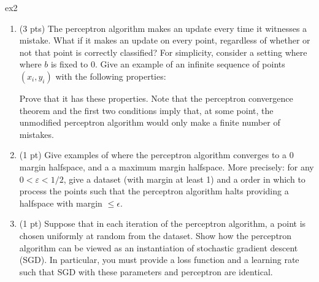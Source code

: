 \documentclass{tron}
\newcommand{\mref}[1]{\underline{\textbf{\hypersetup{linkcolor=orange}\Cref{#1}\hypersetup{linkcolor=blue}}}}
\begin{document}
\newpage
\setcounter{section}{2}
\begin{exercise}{ex2}
  \begin{enumerate}
    \item   (3 pts) The perceptron algorithm makes an update every time it witnesses a mistake.
      What if it makes an update on every point, regardless of whether or not that point is correctly classified? 
      For simplicity, consider a setting where where $b$ is fixed to $0$.
      Give an example of an infinite sequence of points $(x_i, y_i)$ with the following properties:
    Prove that it has these properties.
      Note that the perceptron convergence theorem and the first two conditions imply that, at some point, the unmodified perceptron algorithm would only make a finite number of mistakes.

\ans{\mref{ans:2:1}} 

  \item (1 pt)  Give examples of where the perceptron algorithm converges to a 0 margin halfspace, and a  a maximum margin halfspace.  More precisely: for any $0 < \varepsilon < 1/2$, give a dataset (with margin at least 1) and a order in which to process the points such that the perceptron algorithm halts providing a halfspace with margin $\leq \epsilon$. 
    
\ans{\mref{ans:2:2}} 
  \item (1 pt) Suppose that in each iteration of the perceptron algorithm, a point is chosen uniformly at random from the dataset.
    Show how the perceptron algorithm can be viewed as an instantiation of stochastic gradient descent (SGD). 
      In particular, you must provide a loss function and a learning rate such that SGD with these parameters and perceptron are identical. 

\ans{\mref{ans:2:3}} 
  \end{enumerate}
\end{exercise}
\end{document}
